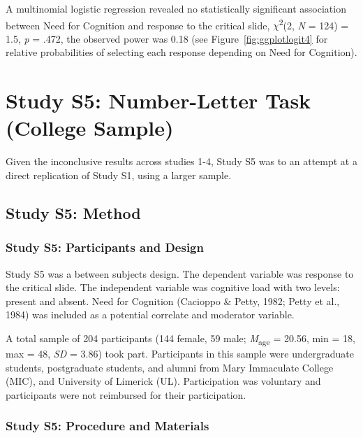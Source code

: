 \documentclass[
  american,
  man,floatsintext]{apa7}
\begin{document}
A multinomial logistic regression revealed no statistically significant association between Need for Cognition and response to the critical slide, \(\chi\)\textsuperscript{2}(2, \emph{N} = 124) = 1.5, \emph{p} = .472, the observed power was 0.18 (see Figure~\ref{fig:ggplotlogit4} for relative probabilities of selecting each response depending on Need for Cognition).

\newpage

\hypertarget{study-s5-number-letter-task-college-sample}{%
\section{Study S5: Number-Letter Task (College Sample)}\label{study-s5-number-letter-task-college-sample}}

Given the inconclusive results across studies 1-4, Study S5 was to an attempt at a direct replication of Study S1, using a larger sample.

\hypertarget{study-s5-method}{%
\subsection{Study S5: Method}\label{study-s5-method}}

\hypertarget{study-s5-participants-and-design}{%
\subsubsection{Study S5: Participants and Design}\label{study-s5-participants-and-design}}

Study S5 was a between subjects design. The dependent variable was response to the critical slide. The independent variable was cognitive load with two levels: present and absent. Need for Cognition (Cacioppo \& Petty, 1982; Petty et al., 1984) was included as a potential correlate and moderator variable.

A total sample of 204 participants (144 female, 59 male; \emph{M}\textsubscript{age} = 20.56, min = 18, max = 48, \emph{SD} = 3.86) took part. Participants in this sample were undergraduate students, postgraduate students, and alumni from Mary Immaculate College (MIC), and University of Limerick (UL). Participation was voluntary and participants were not reimbursed for their participation.

\hypertarget{study-s5-procedure-and-materials}{%
\subsubsection{Study S5: Procedure and Materials}\label{study-s5-procedure-and-materials}}
\end{document}
